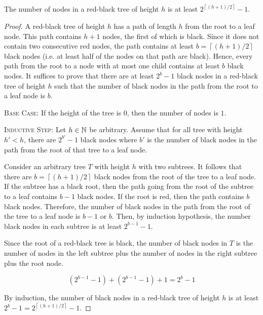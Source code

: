 \begin{lemma}
    The number of nodes in a red-black tree of height $h$ is at least $2^{\left\lceil (h+1)/2 \right\rceil} - 1$.
\end{lemma}

\begin{proof}

    A red-black tree of height $h$ has a path of length $h$ from the root to a leaf node. This path contains $h+1$ nodes, the first of which is black. Since it does not contain two consecutive red nodes, the path contains at least $b = \left\lceil (h+1)/2 \right\rceil $ black nodes (i.e. at least half of the nodes on that path are black). Hence, every path from the root to a node with at most one child contains at least $b$ black nodes.
    It suffices to prove that there are at least $2^b-1$ black nodes in a red-black tree of height $h$ such that the number of black nodes in the path from the root to a leaf node is $b$. 

    \textsc{Base Case:} If the height of the tree is $0$, then the number of nodes is $1$.

    \textsc{Inductive Step:} Let $h \in \mathbb{N}$ be arbitrary. Assume that for all tree with height $h' < h$, there are $2^{b'}-1$ black nodes where $b'$ is the number of black nodes in the path from the root of that tree to a leaf node. 

    Consider an arbitrary tree $T$  with height $h$ with two subtrees. It follows that there are $b = \left\lceil (h+1)/2 \right\rceil$ black nodes from the root of the tree to a leaf node. If the subtree has a black root, then the path going from the root of the subtree to a leaf contains $b-1$ black nodes. If the root is red, then the path contains $b$ black nodes. Therefore, the number of black nodes in the path from the root of the tree to a leaf node is $b-1$ or $b$. Then, by induction hypothesis, the number black nodes in each subtree is at least $2^{b-1}-1$.

    Since the root of a red-black tree is black, the number of black nodes in $T$ is the number of nodes in the left subtree plus the number of nodes in the right subtree plus the root node.

    $$
    \left( 2^{b-1}-1 \right) + \left( 2^{b-1}-1 \right) + 1 = 2^{b}-1
    $$

    By induction, the number of black nodes in a red-black tree of height $h$ is at least $2^{b}-1 = 2^{\left\lceil (h+1)/2 \right\rceil} - 1$.

\end{proof}


